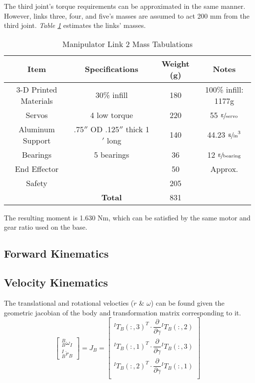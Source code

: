 The third joint’s torque requirements can be approximated in the same manner. However, links three, four, and five’s masses are assumed to act 200 mm from the third joint. \emph{Table \ref{tab:arm2}} estimates the links’ masses.

\begin{table}[htp]
  \center
  \caption{Manipulator Link 2 Mass Tabulations}
  \label{tab:arm2}
\begin{tabular}{cc|cc}
\textbf{Item} & \textbf{Specifications} & \textbf{Weight (g)} & \textbf{Notes} \\\hline
3-D Printed Materials & 30\% infill & 180 & 100\% infill: 1177g \\
Servos & 4 low torque & 220 & 55 $\sfrac{\text{g}}{\text{servo}}$ \\
Aluminum Support & .75$''$ OD .125$''$ thick 1$'$ long & 140 & 44.23 $\sfrac{\text{g}}{\text{in}}^3$ \\
Bearings & 5 bearings & 36 & 12 $\sfrac{\text{g}}{\text{bearing}}$ \\
End Effector & & 50 & Approx. \\
Safety & & 205 & \\
& \textbf{Total} & 831 & \\
\end{tabular}
\end{table}

The resulting moment is 1.630 Nm, which can be satisfied by the same motor and gear ratio used on the base.

\subsection{Forward Kinematics}

\subsection{Velocity Kinematics}
The translational and rotational velocties ($\dot{r}$ \& $\omega$) can be found given the geometric jacobian of the body and transformation matrix corresponding to it.
\[
\begin{bmatrix}
  ^B_B\omega_I\\
  ^I_B\dot{r}_B
\end{bmatrix}
= J_B =
\begin{bmatrix}
  ^IT_B(:,3)^T \cdot \dfrac{\partial}{\partial\gamma}{}^IT_B(:,2) \\
  ^IT_B(:,1)^T \cdot \dfrac{\partial}{\partial\gamma}{}^IT_B(:,3) \\
  ^IT_B(:,2)^T \cdot \dfrac{\partial}{\partial\gamma}{}^IT_B(:,1) \\
\end{bmatrix}
\]

